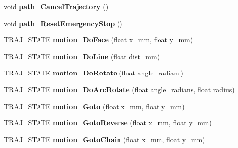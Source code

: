 \begin{DoxyCompactItemize}
void {\bfseries path\+\_\+\+Cancel\+Trajectory} ()
\item 
\mbox{\label{classAsservDriver_aa54769b7bbe83fefa64925aa60089096}} 
void {\bfseries path\+\_\+\+Reset\+Emergency\+Stop} ()
\item 
\mbox{\label{classAsservDriver_af7b023caadc3314c7640c98378829636}} 
\hyperlink{path__manager_8h_adb3360abeb29758da93865c8afcb80eb}{T\+R\+A\+J\+\_\+\+S\+T\+A\+TE} {\bfseries motion\+\_\+\+Do\+Face} (float x\+\_\+mm, float y\+\_\+mm)
\item 
\mbox{\label{classAsservDriver_a1b4a90efa1f4416161944d9b164be2bc}} 
\hyperlink{path__manager_8h_adb3360abeb29758da93865c8afcb80eb}{T\+R\+A\+J\+\_\+\+S\+T\+A\+TE} {\bfseries motion\+\_\+\+Do\+Line} (float dist\+\_\+mm)
\item 
\mbox{\label{classAsservDriver_aca1011c3fb10e594e836ea4ada6b92ff}} 
\hyperlink{path__manager_8h_adb3360abeb29758da93865c8afcb80eb}{T\+R\+A\+J\+\_\+\+S\+T\+A\+TE} {\bfseries motion\+\_\+\+Do\+Rotate} (float angle\+\_\+radians)
\item 
\mbox{\label{classAsservDriver_aabc36af66a38e2fb735e764730328994}} 
\hyperlink{path__manager_8h_adb3360abeb29758da93865c8afcb80eb}{T\+R\+A\+J\+\_\+\+S\+T\+A\+TE} {\bfseries motion\+\_\+\+Do\+Arc\+Rotate} (float angle\+\_\+radians, float radius)
\item 
\mbox{\label{classAsservDriver_a69d5e40538845c81b490a1ac3444847f}} 
\hyperlink{path__manager_8h_adb3360abeb29758da93865c8afcb80eb}{T\+R\+A\+J\+\_\+\+S\+T\+A\+TE} {\bfseries motion\+\_\+\+Goto} (float x\+\_\+mm, float y\+\_\+mm)
\item 
\mbox{\label{classAsservDriver_a96a9ab08074048b626f5f812c82c7342}} 
\hyperlink{path__manager_8h_adb3360abeb29758da93865c8afcb80eb}{T\+R\+A\+J\+\_\+\+S\+T\+A\+TE} {\bfseries motion\+\_\+\+Goto\+Reverse} (float x\+\_\+mm, float y\+\_\+mm)
\item 
\mbox{\label{classAsservDriver_a990f4ca32eef38a88031daa07fbe4546}} 
\hyperlink{path__manager_8h_adb3360abeb29758da93865c8afcb80eb}{T\+R\+A\+J\+\_\+\+S\+T\+A\+TE} {\bfseries motion\+\_\+\+Goto\+Chain} (float x\+\_\+mm, float y\+\_\+mm)

\end{DoxyCompactItemize}
